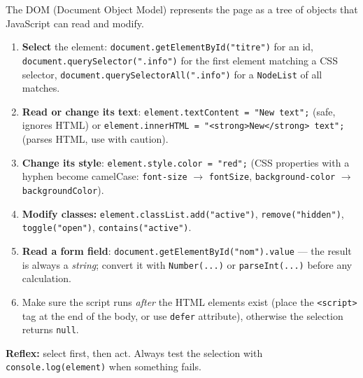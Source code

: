 \documentclass[11pt]{article}
\newcommand{\cle}[1]{{\popxbold\color{popdark}#1}}
\begin{document}
\begin{methode}
The \cle{DOM} (Document Object Model) represents the page as a tree of objects that JavaScript can read and modify.
\begin{enumerate}
\item \textbf{Select} the element: \texttt{document.getElementById("titre")} for an id, \texttt{document.querySelector(".info")} for the first element matching a CSS selector, \texttt{document.querySelectorAll(".info")} for a \texttt{NodeList} of all matches.
\item \textbf{Read or change its text}: \texttt{element.textContent = "New text";} (safe, ignores HTML) or \texttt{element.innerHTML = "<strong>New</strong> text";} (parses HTML, use with caution).
\item \textbf{Change its style}: \texttt{element.style.color = "red";} (CSS properties with a hyphen become camelCase: \texttt{font-size} $\rightarrow$ \texttt{fontSize}, \texttt{background-color} $\rightarrow$ \texttt{backgroundColor}).
\item \textbf{Modify classes:} \texttt{element.classList.add("active")}, \texttt{remove("hidden")}, \texttt{toggle("open")}, \texttt{contains("active")}.
\item \textbf{Read a form field}: \texttt{document.getElementById("nom").value} — the result is always a \emph{string}; convert it with \texttt{Number(...)} or \texttt{parseInt(...)} before any calculation.
\item Make sure the script runs \emph{after} the HTML elements exist (place the \texttt{<script>} tag at the end of the body, or use \texttt{defer} attribute), otherwise the selection returns \texttt{null}.
\end{enumerate}
\textbf{Reflex:} select first, then act. Always test the selection with \texttt{console.log(element)} when something fails.
\end{methode}
\end{document}
